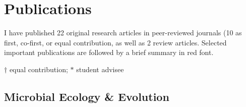 \documentclass[11pt,a4paper]{article}
\begin{document}
\medskip



\pagebreak

\section*{Publications}

  I have published 22 original research articles in peer-reviewed journals 
(10 as first, co-first, or equal contribution, as well as 
2 review articles. Selected important publications are followed
by a brief summary in red font.

$\dagger$ equal contribution; $\ast$ student advisee

    \subsection*{Microbial Ecology \& Evolution}
\end{document}
